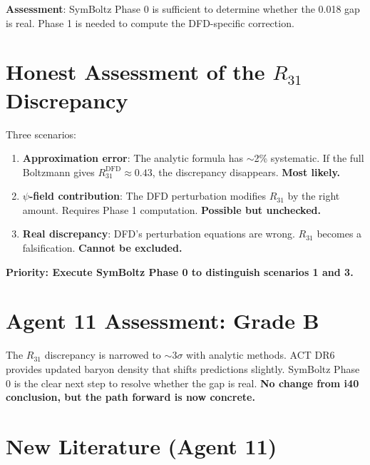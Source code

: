 \documentclass[11pt,a4paper]{article}
\begin{document}
\textbf{Assessment}: SymBoltz Phase 0 is sufficient to determine whether the 0.018 gap is real. Phase 1 is needed to compute the DFD-specific correction.

\section{Honest Assessment of the $R_{31}$ Discrepancy}

Three scenarios:
\begin{enumerate}
\item \textbf{Approximation error}: The analytic formula has $\sim$2\% systematic. If the full Boltzmann gives $R_{31}^{\text{DFD}} \approx 0.43$, the discrepancy disappears. \textbf{Most likely.}
\item \textbf{$\psi$-field contribution}: The DFD perturbation modifies $R_{31}$ by the right amount. Requires Phase 1 computation. \textbf{Possible but unchecked.}
\item \textbf{Real discrepancy}: DFD's perturbation equations are wrong. $R_{31}$ becomes a falsification. \textbf{Cannot be excluded.}
\end{enumerate}

\textbf{Priority: Execute SymBoltz Phase 0 to distinguish scenarios 1 and 3.}

\section{Agent 11 Assessment: Grade B}

The $R_{31}$ discrepancy is narrowed to $\sim 3\sigma$ with analytic methods. ACT DR6 provides updated baryon density that shifts predictions slightly. SymBoltz Phase 0 is the clear next step to resolve whether the gap is real. \textbf{No change from i40 conclusion, but the path forward is now concrete.}

\section{New Literature (Agent 11)}
\end{document}
